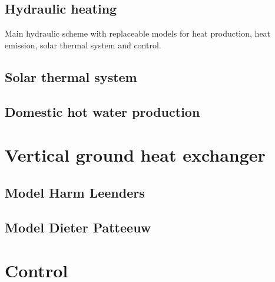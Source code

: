 \subsection{Hydraulic heating}

Main hydraulic scheme with replaceable models for heat production, heat emission, solar thermal system and control.

\subsection{Solar thermal system}

\subsection{Domestic hot water production}

\section{Vertical ground heat exchanger}

\subsection{Model Harm Leenders}

\subsection{Model Dieter Patteeuw}

\section{Control}


%









